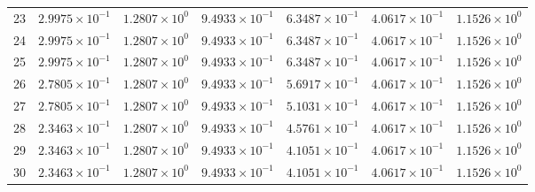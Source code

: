\begin{table}[H]
\begin{tabular}{@{}rrrrrrr@{}}
23 & $2.9975\times10^{-1}$ & $1.2807\times10^{0}$ & $9.4933\times10^{-1}$ & $6.3487\times10^{-1}$ & $4.0617\times10^{-1}$ & $1.1526\times10^{0}$\\
24 & $2.9975\times10^{-1}$ & $1.2807\times10^{0}$ & $9.4933\times10^{-1}$ & $6.3487\times10^{-1}$ & $4.0617\times10^{-1}$ & $1.1526\times10^{0}$\\
25 & $2.9975\times10^{-1}$ & $1.2807\times10^{0}$ & $9.4933\times10^{-1}$ & $6.3487\times10^{-1}$ & $4.0617\times10^{-1}$ & $1.1526\times10^{0}$\\
26 & $2.7805\times10^{-1}$ & $1.2807\times10^{0}$ & $9.4933\times10^{-1}$ & $5.6917\times10^{-1}$ & $4.0617\times10^{-1}$ & $1.1526\times10^{0}$\\
27 & $2.7805\times10^{-1}$ & $1.2807\times10^{0}$ & $9.4933\times10^{-1}$ & $5.1031\times10^{-1}$ & $4.0617\times10^{-1}$ & $1.1526\times10^{0}$\\
28 & $2.3463\times10^{-1}$ & $1.2807\times10^{0}$ & $9.4933\times10^{-1}$ & $4.5761\times10^{-1}$ & $4.0617\times10^{-1}$ & $1.1526\times10^{0}$\\
29 & $2.3463\times10^{-1}$ & $1.2807\times10^{0}$ & $9.4933\times10^{-1}$ & $4.1051\times10^{-1}$ & $4.0617\times10^{-1}$ & $1.1526\times10^{0}$\\
30 & $2.3463\times10^{-1}$ & $1.2807\times10^{0}$ & $9.4933\times10^{-1}$ & $4.1051\times10^{-1}$ & $4.0617\times10^{-1}$ & $1.1526\times10^{0}$\\
\bottomrule
\end{tabular}
\end{table}

